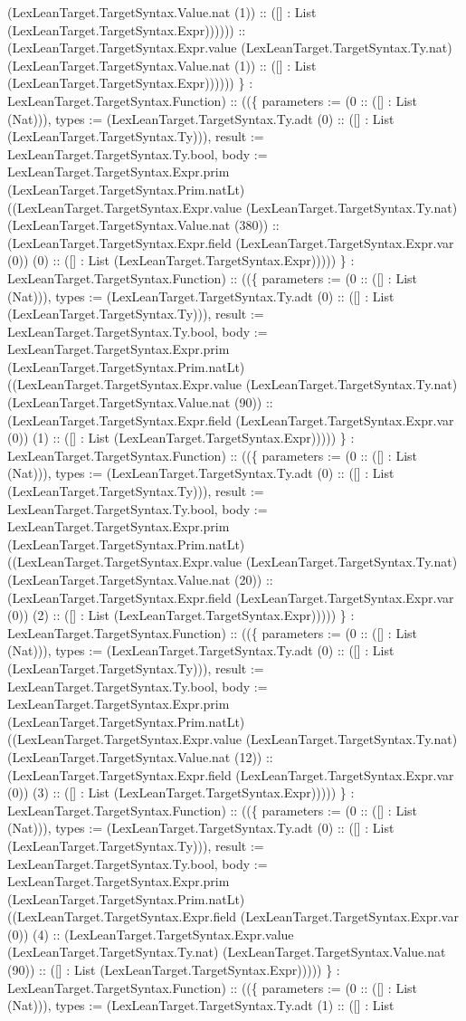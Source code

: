\documentclass[11pt]{article}
\begin{document}
(LexLeanTarget.TargetSyntax.Value.nat (1)) :: ([] : List (LexLeanTarget.TargetSyntax.Expr)))))) :: (LexLeanTarget.TargetSyntax.Expr.value (LexLeanTarget.TargetSyntax.Ty.nat) (LexLeanTarget.TargetSyntax.Value.nat (1)) :: ([] : List (LexLeanTarget.TargetSyntax.Expr)))))) \} : LexLeanTarget.TargetSyntax.Function) :: ((\{ parameters := (0 :: ([] : List (Nat))), types := (LexLeanTarget.TargetSyntax.Ty.adt (0) :: ([] : List (LexLeanTarget.TargetSyntax.Ty))), result := LexLeanTarget.TargetSyntax.Ty.bool, body := LexLeanTarget.TargetSyntax.Expr.prim (LexLeanTarget.TargetSyntax.Prim.natLt) ((LexLeanTarget.TargetSyntax.Expr.value (LexLeanTarget.TargetSyntax.Ty.nat) (LexLeanTarget.TargetSyntax.Value.nat (380)) :: (LexLeanTarget.TargetSyntax.Expr.field (LexLeanTarget.TargetSyntax.Expr.var (0)) (0) :: ([] : List (LexLeanTarget.TargetSyntax.Expr))))) \} : LexLeanTarget.TargetSyntax.Function) :: ((\{ parameters := (0 :: ([] : List (Nat))), types := (LexLeanTarget.TargetSyntax.Ty.adt (0) :: ([] : List (LexLeanTarget.TargetSyntax.Ty))), result := LexLeanTarget.TargetSyntax.Ty.bool, body := LexLeanTarget.TargetSyntax.Expr.prim (LexLeanTarget.TargetSyntax.Prim.natLt) ((LexLeanTarget.TargetSyntax.Expr.value (LexLeanTarget.TargetSyntax.Ty.nat) (LexLeanTarget.TargetSyntax.Value.nat (90)) :: (LexLeanTarget.TargetSyntax.Expr.field (LexLeanTarget.TargetSyntax.Expr.var (0)) (1) :: ([] : List (LexLeanTarget.TargetSyntax.Expr))))) \} : LexLeanTarget.TargetSyntax.Function) :: ((\{ parameters := (0 :: ([] : List (Nat))), types := (LexLeanTarget.TargetSyntax.Ty.adt (0) :: ([] : List (LexLeanTarget.TargetSyntax.Ty))), result := LexLeanTarget.TargetSyntax.Ty.bool, body := LexLeanTarget.TargetSyntax.Expr.prim (LexLeanTarget.TargetSyntax.Prim.natLt) ((LexLeanTarget.TargetSyntax.Expr.value (LexLeanTarget.TargetSyntax.Ty.nat) (LexLeanTarget.TargetSyntax.Value.nat (20)) :: (LexLeanTarget.TargetSyntax.Expr.field (LexLeanTarget.TargetSyntax.Expr.var (0)) (2) :: ([] : List (LexLeanTarget.TargetSyntax.Expr))))) \} : LexLeanTarget.TargetSyntax.Function) :: ((\{ parameters := (0 :: ([] : List (Nat))), types := (LexLeanTarget.TargetSyntax.Ty.adt (0) :: ([] : List (LexLeanTarget.TargetSyntax.Ty))), result := LexLeanTarget.TargetSyntax.Ty.bool, body := LexLeanTarget.TargetSyntax.Expr.prim (LexLeanTarget.TargetSyntax.Prim.natLt) ((LexLeanTarget.TargetSyntax.Expr.value (LexLeanTarget.TargetSyntax.Ty.nat) (LexLeanTarget.TargetSyntax.Value.nat (12)) :: (LexLeanTarget.TargetSyntax.Expr.field (LexLeanTarget.TargetSyntax.Expr.var (0)) (3) :: ([] : List (LexLeanTarget.TargetSyntax.Expr))))) \} : LexLeanTarget.TargetSyntax.Function) :: ((\{ parameters := (0 :: ([] : List (Nat))), types := (LexLeanTarget.TargetSyntax.Ty.adt (0) :: ([] : List (LexLeanTarget.TargetSyntax.Ty))), result := LexLeanTarget.TargetSyntax.Ty.bool, body := LexLeanTarget.TargetSyntax.Expr.prim (LexLeanTarget.TargetSyntax.Prim.natLt) ((LexLeanTarget.TargetSyntax.Expr.field (LexLeanTarget.TargetSyntax.Expr.var (0)) (4) :: (LexLeanTarget.TargetSyntax.Expr.value (LexLeanTarget.TargetSyntax.Ty.nat) (LexLeanTarget.TargetSyntax.Value.nat (90)) :: ([] : List (LexLeanTarget.TargetSyntax.Expr))))) \} : LexLeanTarget.TargetSyntax.Function) :: ((\{ parameters := (0 :: ([] : List (Nat))), types := (LexLeanTarget.TargetSyntax.Ty.adt (1) :: ([] : List 
\end{document}
